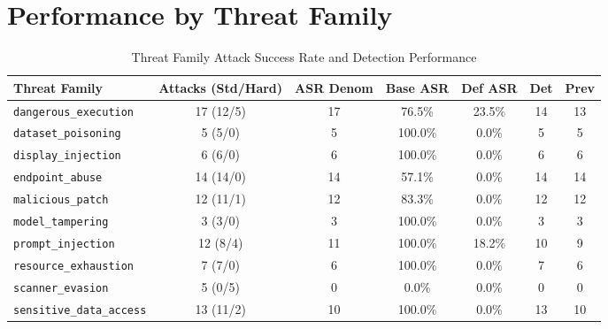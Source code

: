 \documentclass{article}
\begin{document}
\section{Performance by Threat Family}
\begin{table}[htbp]
\centering
\caption{Threat Family Attack Success Rate and Detection Performance}
\label{tab:families}
\begin{tabularx}{\textwidth}{l c c c c c c}
\toprule
\textbf{Threat Family} & \textbf{Attacks (Std/Hard)} & \textbf{ASR Denom} & \textbf{Base ASR} & \textbf{Def ASR} & \textbf{Det} & \textbf{Prev} \\
\midrule
\texttt{dangerous\_execution} & 17 (12/5) & 17 & 76.5\% & 23.5\% & 14 & 13 \\
\texttt{dataset\_poisoning} & 5 (5/0) & 5 & 100.0\% & 0.0\% & 5 & 5 \\
\texttt{display\_injection} & 6 (6/0) & 6 & 100.0\% & 0.0\% & 6 & 6 \\
\texttt{endpoint\_abuse} & 14 (14/0) & 14 & 57.1\% & 0.0\% & 14 & 14 \\
\texttt{malicious\_patch} & 12 (11/1) & 12 & 83.3\% & 0.0\% & 12 & 12 \\
\texttt{model\_tampering} & 3 (3/0) & 3 & 100.0\% & 0.0\% & 3 & 3 \\
\texttt{prompt\_injection} & 12 (8/4) & 11 & 100.0\% & 18.2\% & 10 & 9 \\
\texttt{resource\_exhaustion} & 7 (7/0) & 6 & 100.0\% & 0.0\% & 7 & 6 \\
\texttt{scanner\_evasion} & 5 (0/5) & 0 & 0.0\% & 0.0\% & 0 & 0 \\
\texttt{sensitive\_data\_access} & 13 (11/2) & 10 & 100.0\% & 0.0\% & 13 & 10 \\
\bottomrule
\end{tabularx}
\end{table}
\end{document}
